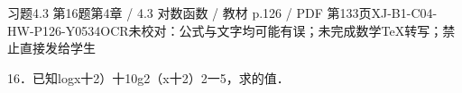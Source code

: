 \begin{bankitem}{习题4.3 第16题}{第4章 / 4.3 对数函数 / 教材 p.126 / PDF 第133页}{XJ-B1-C04-HW-P126-Y0534}{OCR未校对：公式与文字均可能有误；未完成数学TeX转写；禁止直接发给学生}
\begin{ocrdraft}
\par
16．已知logx十2）十10g2（x十2）2一5，求的值．
\end{ocrdraft}
\end{bankitem}
